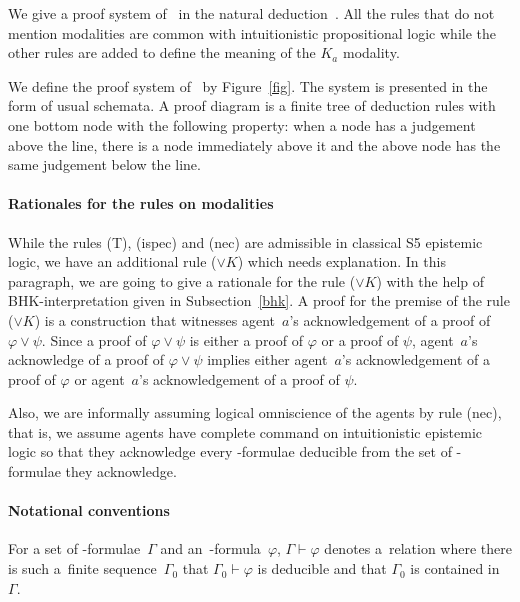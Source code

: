   We give a proof system of \iec\, in the natural deduction~\citep{gentzen, prawitz1971ideas}.
  All the rules that do not mention modalities are common with
  intuitionistic propositional logic while the other rules are added
  to define the meaning of the $K_a$ modality.
  \begin{definition}
   We define the proof system of \iec\, by Figure~\ref{fig}.
   The system is presented in the form of usual schemata.
   A proof diagram is a finite tree of deduction rules with one bottom node with the
   following property: when a node has a judgement
   above the line, there is a node immediately above it and the above node
   has the same judgement below the line.
  \end{definition}

    \paragraph{Rationales for the rules on modalities}

    While the rules (T), (ispec) and (nec) are admissible in classical S5 epistemic logic,
    we have an additional rule ($\vee K$) which needs explanation.
    In this paragraph, we are going to give a rationale for the rule ($\vee K$) with the help
    of BHK-interpretation given in Subsection~\ref{bhk}.
    A proof for the premise of the rule ($\vee K$) is a construction that witnesses agent~$a$'s
    acknowledgement of a proof of $\varphi\vee\psi$.
    Since a proof of $\varphi\vee\psi$ is either a proof of $\varphi$ or a proof of $\psi$,
    agent~$a$'s acknowledge of a proof of $\varphi\vee\psi$ implies either agent~$a$'s
    acknowledgement of a proof of $\varphi$ or agent~$a$'s acknowledgement of a proof of $\psi$.

    Also,
    we are informally
    assuming logical omniscience of the agents by rule (nec),
    that is, we assume agents have complete
    command on intuitionistic epistemic logic so that they acknowledge every \iec-formulae
    deducible from the set of \iec-formulae they acknowledge.

    \paragraph{Notational conventions}
    For a set of \iec-formulae~$\Gamma$ and an~\iec-formula~$\varphi$, $\Gamma\vdash
    \varphi$ denotes a~relation where
    there is such a~finite sequence~$\Gamma_0$ that
    $\Gamma_0\vdash
    \varphi$ is deducible and that $\Gamma_0$ is contained in $\Gamma$.

